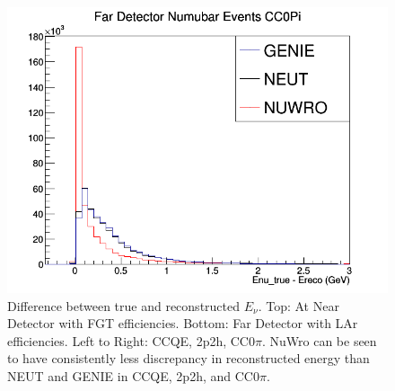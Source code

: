 \documentclass[12pt]{article}
\begin{document}
\begin{figure}[h]
\endminipage
{}
\includegraphics[width=\linewidth]{Ereco_Etrue/numubar_FD_CC0Pi.png}
\endminipage
\caption{Difference between true and reconstructed $E_\nu$. Top: At Near Detector with FGT efficiencies. Bottom: Far Detector with LAr efficiencies. Left to Right: CCQE, 2p2h, CC0$\pi$. NuWro can be seen to have consistently less discrepancy in reconstructed energy than NEUT and GENIE in CCQE, 2p2h, and CC0$\pi$. }
\label{fig:numubar_Etrue_ereco_FGT_CCQE_2p2h_CC0Pi}
\end{figure}
\end{document}
